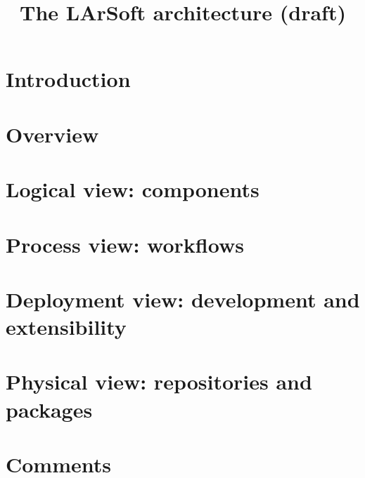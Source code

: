 \documentclass{article}
\begin{document}
\title{The LArSoft architecture (draft)}

\maketitle

\linenumbers

\tableofcontents

\section{Introduction}
\label{sec:introduction}




\section{Overview}
\label{sec:Overview}




\section{Logical view: components}
\label{sec:Components}




\section{Process view: workflows}
\label{sec:Workflows}




\section{Deployment view: development and extensibility}
\label{sec:Development}




\section{Physical view: repositories and packages}
\label{sec:Packages}








\clearpage
\appendix


\section*{Comments}
\label{sec:comments}


\end{document}
